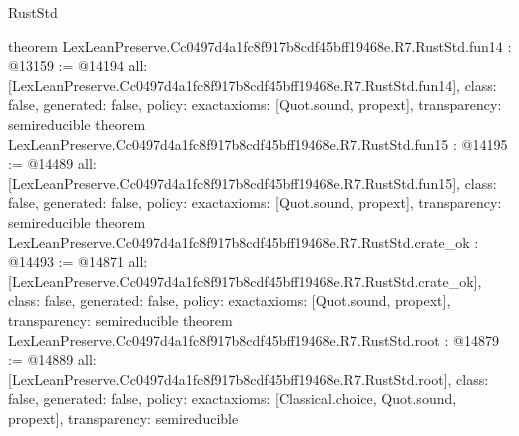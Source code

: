 \begin{lexlean}{RustStd}
\begin{coremodule}
{}
theorem LexLeanPreserve.Cc0497d4a1fc8f917b8cdf45bff19468e.R7.RustStd.fun14 : @13159 := @14194 {
  all: [LexLeanPreserve.Cc0497d4a1fc8f917b8cdf45bff19468e.R7.RustStd.fun14],
  class: false,
  generated: false,
  policy: exact{axioms: [Quot.sound, propext]},
  transparency: semireducible
}
theorem LexLeanPreserve.Cc0497d4a1fc8f917b8cdf45bff19468e.R7.RustStd.fun15 : @14195 := @14489 {
  all: [LexLeanPreserve.Cc0497d4a1fc8f917b8cdf45bff19468e.R7.RustStd.fun15],
  class: false,
  generated: false,
  policy: exact{axioms: [Quot.sound, propext]},
  transparency: semireducible
}
theorem LexLeanPreserve.Cc0497d4a1fc8f917b8cdf45bff19468e.R7.RustStd.crate_ok : @14493 := @14871 {
  all: [LexLeanPreserve.Cc0497d4a1fc8f917b8cdf45bff19468e.R7.RustStd.crate_ok],
  class: false,
  generated: false,
  policy: exact{axioms: [Quot.sound, propext]},
  transparency: semireducible
}
theorem LexLeanPreserve.Cc0497d4a1fc8f917b8cdf45bff19468e.R7.RustStd.root : @14879 := @14889 {
  all: [LexLeanPreserve.Cc0497d4a1fc8f917b8cdf45bff19468e.R7.RustStd.root],
  class: false,
  generated: false,
  policy: exact{axioms: [Classical.choice, Quot.sound, propext]},
  transparency: semireducible
}


\end{coremodule}
\end{lexlean}
